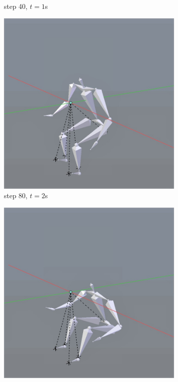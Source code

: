 \documentclass[10pt,twocolumn,letterpaper]{article}
\begin{document}
\begin{figure}
\begin{subfigure}{0.2\textwidth}
        \caption{step 40, $t=1$s}
    \end{subfigure}\begin{subfigure}{0.2\textwidth}
        \centering
        \includegraphics[width=.9\linewidth]{sit-2.jpg}
        \caption{step 80, $t=2$s}
    \end{subfigure}\begin{subfigure}{0.2\textwidth}
        \centering
        \includegraphics[width=.9\linewidth]{sit-3.jpg}

\end{subfigure}
\end{figure}
\end{document}

